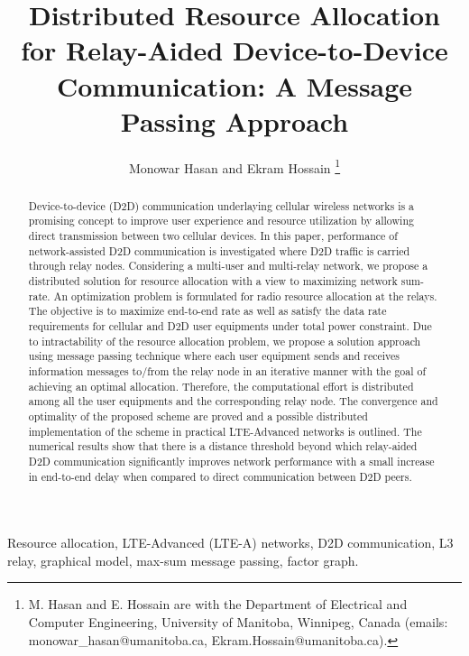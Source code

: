 \documentclass[twocolumn,10pt]{IEEEtran}
\begin{document}
\title{Distributed Resource Allocation for Relay-Aided Device-to-Device Communication: A Message Passing Approach}
\author{Monowar Hasan and Ekram Hossain
\thanks{M. Hasan and E. Hossain are with the Department of Electrical and Computer Engineering, University of Manitoba, Winnipeg, Canada (emails:  monowar\_hasan@umanitoba.ca, Ekram.Hossain@umanitoba.ca).}} 

\maketitle



\begin{abstract}

Device-to-device (D2D) communication underlaying cellular wireless networks is a promising concept to improve user experience and resource utilization by allowing direct transmission between two cellular devices.  In this paper, performance of network-assisted D2D communication is investigated where D2D traffic is carried through relay nodes. Considering a multi-user and multi-relay network, we propose a distributed solution for resource allocation with a view to maximizing network sum-rate. An optimization problem is formulated for  radio resource allocation at the relays. The objective is to maximize end-to-end rate as well as satisfy the data rate requirements for cellular and D2D user equipments under total power constraint. Due to intractability of the resource allocation problem, we propose a solution approach using message passing technique  where each user equipment sends and receives information messages to/from the relay node in an iterative manner with the goal of achieving an optimal allocation. Therefore, the computational effort is distributed among all the user equipments and the corresponding relay node. The convergence and optimality of the proposed scheme are proved and a possible distributed implementation of the scheme in practical LTE-Advanced networks is outlined. The numerical results show that there is a distance threshold beyond which relay-aided D2D communication significantly improves network performance with a small increase in end-to-end delay when compared to direct communication between D2D peers.
\end{abstract}


\begin{IEEEkeywords}
Resource allocation, LTE-Advanced (LTE-A) networks, D2D communication, L3 relay, graphical model, max-sum message passing, factor graph.
\end{IEEEkeywords}
\end{document}
